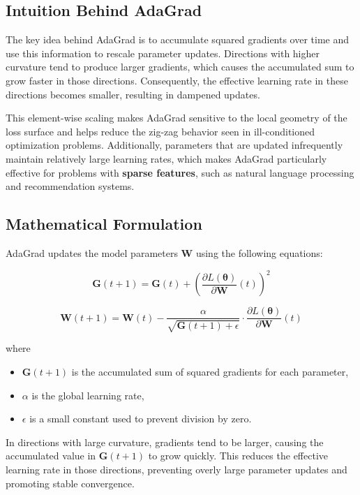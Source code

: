 \documentclass{article}
\begin{document}
\subsection{Intuition Behind AdaGrad}

The key idea behind AdaGrad is to accumulate squared gradients over time and use this information to rescale parameter updates. Directions with higher curvature tend to produce larger gradients, which causes the accumulated sum to grow faster in those directions. Consequently, the effective learning rate in these directions becomes smaller, resulting in dampened updates.

This element-wise scaling makes AdaGrad sensitive to the local geometry of the loss surface and helps reduce the zig-zag behavior seen in ill-conditioned optimization problems. Additionally, parameters that are updated infrequently maintain relatively large learning rates, which makes AdaGrad particularly effective for problems with \textbf{sparse features}, such as natural language processing and recommendation systems.

\subsection{Mathematical Formulation}

AdaGrad updates the model parameters \( \mathbf{W} \) using the following equations:

\[
\mathbf{G}(t+1) = \mathbf{G}(t) + \left( \frac{\partial L(\boldsymbol{\theta})}{\partial \mathbf{W}}(t) \right)^2
\]

\[
\mathbf{W}(t+1) = \mathbf{W}(t) - 
\frac{\alpha}{\sqrt{\mathbf{G}(t+1) + \epsilon}}
\cdot 
\frac{\partial L(\boldsymbol{\theta})}{\partial \mathbf{W}}(t)
\]

\noindent where
\begin{itemize}
    \item \( \mathbf{G}(t+1) \) is the accumulated sum of squared gradients for each parameter,
    \item \( \alpha \) is the global learning rate,
    \item \( \epsilon \) is a small constant used to prevent division by zero.
\end{itemize}

In directions with large curvature, gradients tend to be larger, causing the accumulated value in \( \mathbf{G}(t+1) \) to grow quickly. This reduces the effective learning rate in those directions, preventing overly large parameter updates and promoting stable convergence.
\end{document}
